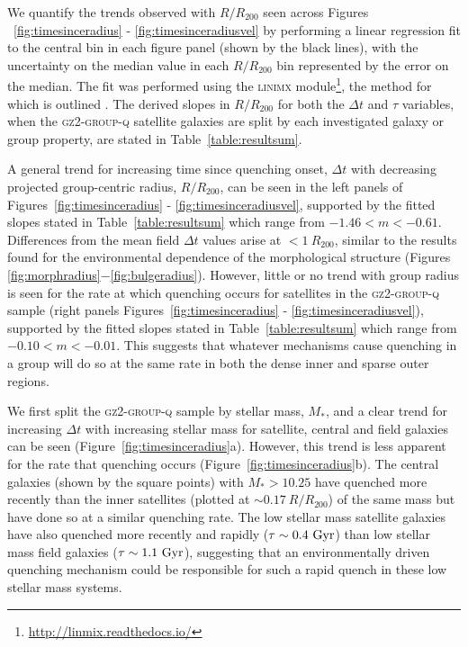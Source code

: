 \documentclass[useAMS,usenatbib]{mn2e}
\begin{document}
We quantify the trends observed with $R/R_{200}$ seen across Figures ~\ref{fig:timesinceradius} - \ref{fig:timesinceradiusvel} by performing a linear regression fit to the central bin in each figure panel (shown by the black lines), with the uncertainty on the median value in each $R/R_{200}$ bin represented by the error on the median. The fit was performed using the \textsc{linimx} module\footnote{\url{http://linmix.readthedocs.io/}}, the method for which is outlined \citealt{kelly07}. The derived slopes in $R/R_{200}$ for both the $\Delta t$ and $\tau$ variables, when the \textsc{gz2-group-q} satellite galaxies are split by each investigated galaxy or group property, are stated in Table~\ref{table:resultsum}.


A general trend for increasing time since quenching onset, $\Delta t$ with decreasing projected group-centric radius, $R/R_{200}$, can be seen in the left panels of Figures~\ref{fig:timesinceradius} - \ref{fig:timesinceradiusvel}, supported by the fitted slopes stated in Table~\ref{table:resultsum} which range from $-1.46 < m < -0.61$. Differences from the mean field $\Delta t$ values arise at $<1~R_{200}$, similar to the results found for the environmental dependence of the morphological structure (Figures \ref{fig:morphradius}$-$\ref{fig:bulgeradius}). However, little or no trend with group radius is seen for the rate at which quenching occurs for satellites in the \textsc{gz2-group-q} sample (right panels Figures~\ref{fig:timesinceradius} - \ref{fig:timesinceradiusvel}), supported by the fitted slopes stated in Table~\ref{table:resultsum} which range from $-0.10 < m < -0.01$. This suggests that whatever mechanisms cause quenching in a group will do so at the same rate in both the dense inner and sparse outer regions. 

We first split the \textsc{gz2-group-q} sample by stellar mass, $M_*$, and a clear trend for increasing $\Delta t$ with increasing stellar mass for satellite, central and field galaxies can be seen (Figure~\ref{fig:timesinceradius}a). However, this trend is less apparent for the rate that quenching occurs (Figure~\ref{fig:timesinceradius}b). The central galaxies (shown by the square points) with $M_* > 10.25$ have quenched more recently than the inner satellites (plotted at $\sim0.17~R/R_{200}$) of the same mass but have done so at a similar quenching rate. The low stellar mass satellite galaxies have also quenched more recently and rapidly ($\tau\sim0.4~\rm{Gyr}$) than low stellar mass field galaxies ($\tau\sim1.1~\rm{Gyr}$), suggesting that an environmentally driven quenching mechanism could be responsible for such a rapid quench in these low stellar mass systems. 
\end{document}
